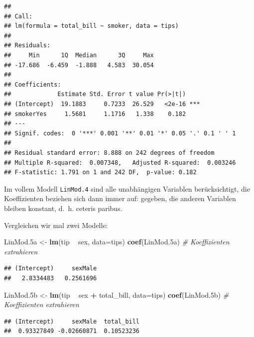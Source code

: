 \documentclass[12pt,ngerman,paper=a4,pagesize,DIV=13]{scrreprt}
\newenvironment{Shaded}{\begin{snugshade}}{\end{snugshade}}
\newcommand{\CommentTok}[1]{\textcolor[rgb]{0.56,0.35,0.01}{\textit{#1}}}
\newcommand{\DataTypeTok}[1]{\textcolor[rgb]{0.13,0.29,0.53}{#1}}
\newcommand{\FloatTok}[1]{\textcolor[rgb]{0.00,0.00,0.81}{#1}}
\newcommand{\KeywordTok}[1]{\textcolor[rgb]{0.13,0.29,0.53}{\textbf{#1}}}
\newcommand{\NormalTok}[1]{#1}
\newcommand{\OperatorTok}[1]{\textcolor[rgb]{0.81,0.36,0.00}{\textbf{#1}}}
\newcommand{\StringTok}[1]{\textcolor[rgb]{0.31,0.60,0.02}{#1}}
\begin{document}
\begin{verbatim}
## 
## Call:
## lm(formula = total_bill ~ smoker, data = tips)
## 
## Residuals:
##     Min      1Q  Median      3Q     Max 
## -17.686  -6.459  -1.888   4.583  30.054 
## 
## Coefficients:
##             Estimate Std. Error t value Pr(>|t|)    
## (Intercept)  19.1883     0.7233  26.529   <2e-16 ***
## smokerYes     1.5681     1.1716   1.338    0.182    
## ---
## Signif. codes:  0 '***' 0.001 '**' 0.01 '*' 0.05 '.' 0.1 ' ' 1
## 
## Residual standard error: 8.888 on 242 degrees of freedom
## Multiple R-squared:  0.007348,   Adjusted R-squared:  0.003246 
## F-statistic: 1.791 on 1 and 242 DF,  p-value: 0.182
\end{verbatim}

Im vollem Modell \texttt{LinMod.4} sind alle unabhängigen Variablen
berücksichtigt, die Koeffizienten beziehen sich dann immer auf: gegeben,
die anderen Variablen bleiben konstant, d.~h. ceteris paribus.

Vergleichen wir mal zwei Modelle:

\begin{Shaded}
\begin{Highlighting}[]
\NormalTok{LinMod}\FloatTok{.5}\NormalTok{a <-}\StringTok{ }\KeywordTok{lm}\NormalTok{(tip }\OperatorTok{~}\StringTok{  }\NormalTok{sex, }\DataTypeTok{data=}\NormalTok{tips)}
\KeywordTok{coef}\NormalTok{(LinMod}\FloatTok{.5}\NormalTok{a) }\CommentTok{# Koeffizienten extrahieren}
\end{Highlighting}
\end{Shaded}

\begin{verbatim}
## (Intercept)     sexMale 
##   2.8334483   0.2561696
\end{verbatim}

\begin{Shaded}
\begin{Highlighting}[]
\NormalTok{LinMod}\FloatTok{.5}\NormalTok{b <-}\StringTok{ }\KeywordTok{lm}\NormalTok{(tip }\OperatorTok{~}\StringTok{  }\NormalTok{sex }\OperatorTok{+}\StringTok{ }\NormalTok{total_bill, }\DataTypeTok{data=}\NormalTok{tips)}
\KeywordTok{coef}\NormalTok{(LinMod}\FloatTok{.5}\NormalTok{b) }\CommentTok{# Koeffizienten extrahieren}
\end{Highlighting}
\end{Shaded}

\begin{verbatim}
## (Intercept)     sexMale  total_bill 
##  0.93327849 -0.02660871  0.10523236
\end{verbatim}
\end{document}
